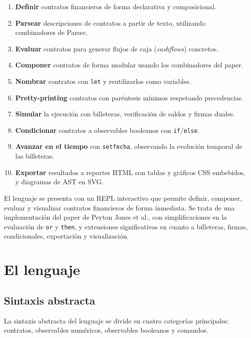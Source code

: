 \documentclass[a4paper, 12pt]{article}
\begin{document}
\begin{enumerate}[nosep]
    \item \textbf{Definir} contratos financieros de forma declarativa y composicional.
    \item \textbf{Parsear} descripciones de contratos a partir de texto, utilizando combinadores de Parsec.
    \item \textbf{Evaluar} contratos para generar flujos de caja (\textit{cashflows}) concretos.
    \item \textbf{Componer} contratos de forma modular usando los combinadores del paper.
    \item \textbf{Nombrar} contratos con \texttt{let} y reutilizarlos como variables.
    \item \textbf{Pretty-printing} contratos con paréntesis mínimos respetando precedencias.
    \item \textbf{Simular} la ejecución con billeteras, verificación de saldos y firmas duales.
    \item \textbf{Condicionar} contratos a observables booleanos con \texttt{if}/\texttt{else}.
    \item \textbf{Avanzar en el tiempo} con \texttt{setfecha}, observando la evolución temporal de las billeteras.
    \item \textbf{Exportar} resultados a reportes HTML con tablas y gráficos CSS embebidos, y diagramas de AST en SVG.
\end{enumerate}

El lenguaje se presenta con un REPL interactivo que permite definir, componer, evaluar y visualizar contratos financieros de forma inmediata. Se trata de una implementación del paper de Peyton Jones et al., con simplificaciones en la evaluación de \texttt{or} y \texttt{then}, y extensiones significativas en cuanto a billeteras, firmas, condicionales, exportación y visualización.

\section{El lenguaje}

\subsection{Sintaxis abstracta}

La sintaxis abstracta del lenguaje se divide en cuatro categorías principales: contratos, observables numéricos, observables booleanos y comandos.
\end{document}
